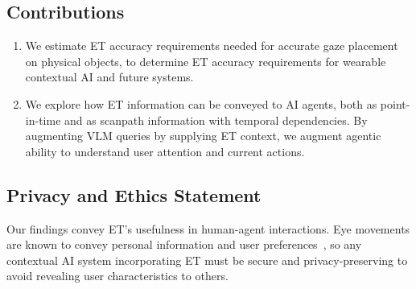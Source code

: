 \subsection{Contributions}

\begin{enumerate}[topsep=0pt]
    \item We estimate ET accuracy requirements needed for accurate gaze placement on physical objects, to determine ET accuracy requirements for wearable contextual AI and future systems.
    \item We explore how ET information can be conveyed to AI agents, both as point-in-time and as scanpath information with temporal dependencies.  By augmenting VLM queries by supplying ET context, we augment agentic ability to understand user attention and current actions.
\end{enumerate}

\subsection{Privacy and Ethics Statement}  Our findings convey ET's usefulness in human-agent interactions.  Eye movements are known to convey personal information and user preferences~\cite{bozkir2023eyetrackedvirtualrealitycomprehensive}, so any contextual AI system incorporating ET must be secure and privacy-preserving to avoid revealing user characteristics to others.

